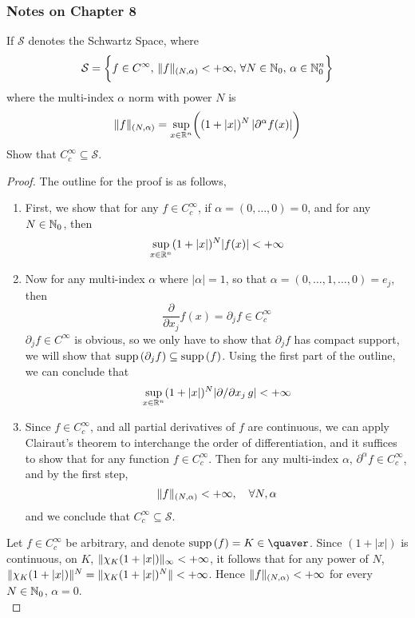 \documentclass[../../main.tex]{subfiles}
\begin{document}
\providecommand{\szz}{\mathcal{S}}
\providecommand{\ccinf}{C_c^\infty}
\subsubsection*{Notes on Chapter 8}
\begin{wts}
    If $\szz$ denotes the Schwartz Space, where
    \[
    \szz = \biggl\{f\in C^\infty,\, \norm{f}_{(N,\alpha)}<+\infty,\,\forall N\in\nat_0,\,\alpha\in\nat_0^n\biggr\}
    \]
    where the multi-index $\alpha$ norm with power $N$ is 
    \[
    \lVert {f} \rVert_{(N,\alpha)}=\sup_{x\in\mathbb{R}^n}\biggl((1+|x|)^N\left|\partial^\alpha f(x)\right|\biggr)
    \]
    Show that $\ccinf\subseteq \szz$.
\end{wts}
\begin{proof}
    The outline for the proof is as follows,
    \begin{enumerate}
        \item First, we show that for any $f\in\ccinf$, if $\alpha = (0,\ldots,0)=0$, and for any $N\in\mathbb{N}_0$, then 
        \[
        \sup_{x\in\mathbb{R}^n}(1+|x|)^N|f(x)|<+\infty
        \]
        \item Now for any multi-index $\alpha$ where $|\alpha| = 1$, so that $\alpha = (0,\ldots,1,\ldots,0)=e_j$, then 
        \[
        \dfrac{\partial}{\partial x_j}f(x)=\partial_j f\in \ccinf
        \]
        $\partial_j f\in C^\infty$ is obvious, so we only have to show that $\partial_j f$ has compact support, we will show that $\operatorname{supp}{(\partial_j f)}\subseteq \operatorname{supp}{(f)}$. Using the first part of the outline, we can conclude that
        \[
        \sup_{x\in\mathbb{R}^n}(1+|x|)^N|\partial/\partial x_j\, g|<+\infty
        \]
        \item Since $f\in\ccinf$, and all partial derivatives of $f$ are continuous, we can apply Clairaut's theorem to interchange the order of differentiation, and it suffices to show that for any function $f\in \ccinf$. Then for any multi-index $\alpha$, $\partial^\alpha f\in\ccinf$, and by the first step,
        \[
        \lVert {f} \rVert_{(N,\alpha)}<+\infty,\quad\forall N,\alpha
        \]
        and we conclude that $\ccinf\subseteq \szz$.
    \end{enumerate}
    Let $f\in\ccinf$ be arbitrary, and denote $\supp{f}=K\in\cpt$. Since $(1+|x|)$ is continuous, on $K$, $\lVert {\chi_K(1+|x|)} \rVert_\infty<+\infty$, it follows that for any power of $N$, $\lVert {\chi_K(1+|x|)} \rVert^N=\lVert {\chi_K(1+|x|)^N} \rVert<+\infty$. Hence $\lVert {f} \rVert_{(N,\alpha)}<+\infty$ for every $N\in\mathbb{N}_0$, $\alpha=0$.\\
    

\end{proof}
\end{document}
